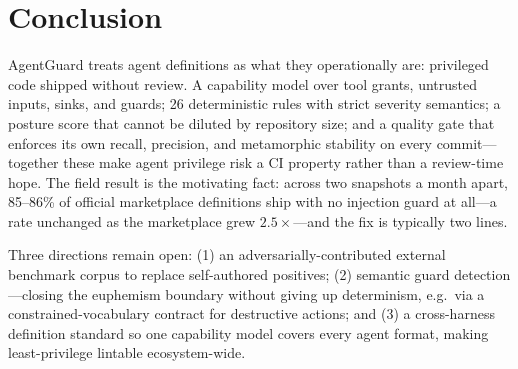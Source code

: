 \documentclass[11pt]{article}
\begin{document}
\section{Conclusion}
AgentGuard treats agent definitions as what they operationally are: privileged code shipped
without review. A capability model over tool grants, untrusted inputs, sinks, and guards; 26
deterministic rules with strict severity semantics; a posture score that cannot be diluted by
repository size; and a quality gate that enforces its own recall, precision, and metamorphic
stability on every commit---together these make agent privilege risk a CI property rather than a
review-time hope. The field result is the motivating fact: across two snapshots a month apart,
85--86\% of official marketplace definitions ship with no injection guard at all---a rate
unchanged as the marketplace grew $2.5\times$---and the fix is typically two lines.

Three directions remain open: (1) an adversarially-contributed external benchmark corpus to
replace self-authored positives; (2) semantic guard detection---closing the euphemism boundary
without giving up determinism, e.g.\ via a constrained-vocabulary contract for destructive
actions; and (3) a cross-harness definition standard so one capability model covers every agent
format, making least-privilege lintable ecosystem-wide.



\end{document}
